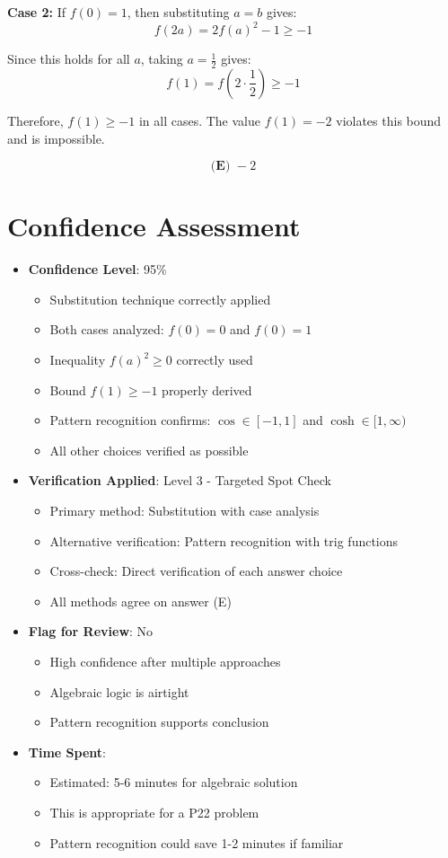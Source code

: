 \documentclass[12pt]{article}
\begin{document}
\textbf{Case 2:} If $f(0) = 1$, then substituting $a = b$ gives:
$$f(2a) = 2f(a)^2 - 1 \geq -1$$

Since this holds for all $a$, taking $a = \frac{1}{2}$ gives:
$$f(1) = f\left(2 \cdot \frac{1}{2}\right) \geq -1$$

Therefore, $f(1) \geq -1$ in all cases. The value $f(1) = -2$ violates this bound and is impossible.

$$\boxed{\textbf{(E) } -2}$$

\section*{Confidence Assessment}
\begin{itemize}[leftmargin=*]
    \item \textbf{Confidence Level}: 95\% 
    \begin{itemize}
        \item Substitution technique correctly applied
        \item Both cases analyzed: $f(0) = 0$ and $f(0) = 1$
        \item Inequality $f(a)^2 \geq 0$ correctly used
        \item Bound $f(1) \geq -1$ properly derived
        \item Pattern recognition confirms: $\cos \in [-1,1]$ and $\cosh \in [1,\infty)$
        \item All other choices verified as possible
    \end{itemize}
    \item \textbf{Verification Applied}: Level 3 - Targeted Spot Check
    \begin{itemize}
        \item Primary method: Substitution with case analysis
        \item Alternative verification: Pattern recognition with trig functions
        \item Cross-check: Direct verification of each answer choice
        \item All methods agree on answer (E)
    \end{itemize}
    \item \textbf{Flag for Review}: No
    \begin{itemize}
        \item High confidence after multiple approaches
        \item Algebraic logic is airtight
        \item Pattern recognition supports conclusion
    \end{itemize}
    \item \textbf{Time Spent}: 
    \begin{itemize}
        \item Estimated: 5-6 minutes for algebraic solution
        \item This is appropriate for a P22 problem
        \item Pattern recognition could save 1-2 minutes if familiar
    \end{itemize}
\end{itemize}
\end{document}

